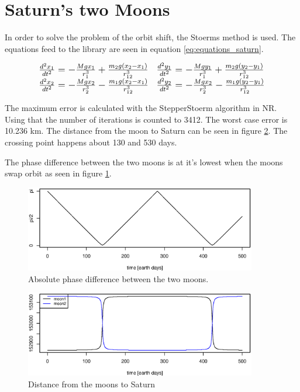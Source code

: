 \section{Saturn's two Moons}
In order to solve the problem of the orbit shift, the Stoerms method is used.
The equations feed to the library are seen in equation \ref{eq:equations_saturn}.

\begin{equation}
\large{
\begin{array}{ll}
\frac{d^2x_1}{dt^2} = - \frac{M g x_1}{r_1^3} + \frac{m_2 g (x_2 - x_1)}{r_{12}^3} &
\frac{d^2y_1}{dt^2} = - \frac{M g y_1}{r_1^3} + \frac{m_2 g (y_2 - y_1)}{r_{12}^3}\\
\frac{d^2x_2}{dt^2} = - \frac{M g x_2}{r_2^3} - \frac{m_1 g (x_2 - x_1)}{r_{12}^3} &
\frac{d^2y_2}{dt^2} = - \frac{M g x_2}{r_2^3} - \frac{m_1 g (y_2 - y_1)}{r_{12}^3}
\end{array}
}
\label{eq:equations_saturn}
\end{equation}

The maximum error is calculated with the StepperStoerm algorithm in NR.
Using that the number of iterations is counted to 3412. The worst case error is 10.236 km.
The distance from the moon to Saturn can be seen in figure \ref{fig:distance}.
The crossing point happens about 130 and 530 days.

The phase difference between the two moons is at it's lowest when the moons swap orbit as seen in figure \ref{fig:angle}.

\begin{figure}[h]
\centering
\includegraphics[width=0.9\textwidth]{graphics/angle}
\caption{Absolute phase difference between the two moons.}
\label{fig:angle}
\end{figure}

\begin{figure}[h]
   \centering
\includegraphics[width=0.9\textwidth]{graphics/distance}
\caption{Distance from the moons to Saturn}
\label{fig:distance}
\end{figure}




